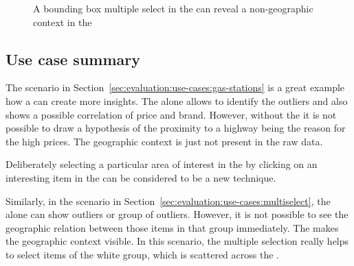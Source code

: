 \begin{figure}
  \centering
  \qquad
  \caption{
    A bounding box multiple select in the \gv{} can reveal a non-geographic context in the \tmap{}
  }\label{fig:evaluation:cases:bounding-box}
\end{figure}

\subsection{Use case summary}

The scenario in Section~\ref{sec:evaluation:use-cases:gas-stations} is a great example how a \gv{} can create more insights.
The \tmap{} alone allows to identify the outliers and also shows a possible correlation of price and brand.
However, without the \gv{} it is not possible to draw a hypothesis of the proximity to a highway being the reason for the high prices.
The geographic context is just not present in the raw data.

Deliberately selecting a particular area of interest in the \gv{} by clicking on an interesting item in the \tmap{} can be considered to be a new technique.

Similarly, in the scenario in Section~\ref{sec:evaluation:use-cases:multiselect}, the \tmap{} alone can show outliers or group of outliers.
However, it is not possible to see the geographic relation between those items in that group immediately.
The \gv{} makes the geographic context visible.
In this scenario, the multiple selection really helps to select items of the white group, which is scattered across the \tmap{}.

